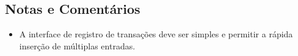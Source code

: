 \subsection*{Notas e Comentários}
\begin{addmargin}[1.5cm]{0cm}
	\begin{itemize}
		\item A interface de registro de transações deve ser simples e permitir a rápida inserção de múltiplas entradas.
	\end{itemize}
\end{addmargin}

